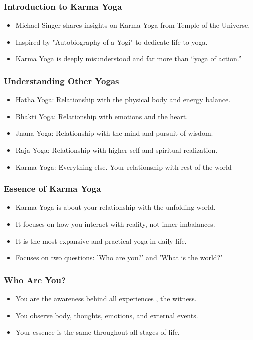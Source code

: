 \begin{frame}[fragile]\frametitle{Introduction to Karma Yoga}
  \begin{itemize}
    \item Michael Singer shares insights on Karma Yoga from Temple of the Universe.
    \item Inspired by "Autobiography of a Yogi" to dedicate life to yoga.
    \item Karma Yoga is deeply misunderstood and far more than “yoga of action.”
  \end{itemize}
\end{frame}

\begin{frame}[fragile]\frametitle{Understanding Other Yogas}
  \begin{itemize}
    \item Hatha Yoga: Relationship with the physical body and energy balance.
    \item Bhakti Yoga: Relationship with emotions and the heart.
    \item Jnana Yoga: Relationship with the mind and pursuit of wisdom.
    \item Raja Yoga: Relationship with higher self and spiritual realization.
	\item Karma Yoga: Everything else. Your relationship with rest of the world
  \end{itemize}
\end{frame}

\begin{frame}[fragile]\frametitle{Essence of Karma Yoga}
  \begin{itemize}
    \item Karma Yoga is about your relationship with the unfolding world.
    \item It focuses on how you interact with reality, not inner imbalances.
    \item It is the most expansive and practical yoga in daily life.
	\item Focuses on two questions: 'Who are you?' and 'What is the world?'
  \end{itemize}
\end{frame}

\begin{frame}[fragile]\frametitle{Who Are You?}
  \begin{itemize}
    \item You are the awareness behind all experiences ,  the witness.
    \item You observe body, thoughts, emotions, and external events.
    \item Your essence is the same throughout all stages of life.
  \end{itemize}
\end{frame}

